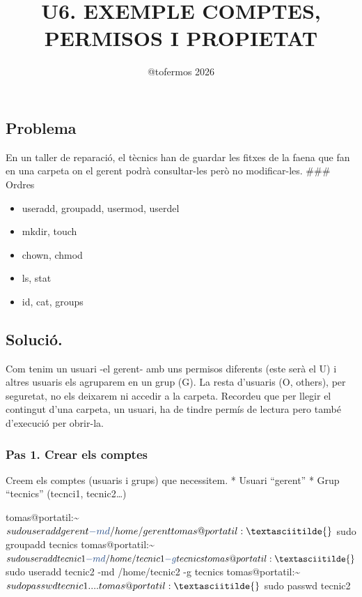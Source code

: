 \documentclass[
  catalan,
  a4paper,
]{article}
\title{U6. EXEMPLE COMPTES, PERMISOS I PROPIETAT}
\author{@tofermos 2026}
\date{}
\newenvironment{Shaded}{\begin{snugshade}}{\end{snugshade}}
\newcommand{\AttributeTok}[1]{\textcolor[rgb]{0.13,0.29,0.53}{#1}}
\newcommand{\ExtensionTok}[1]{#1}
\newcommand{\NormalTok}[1]{#1}
\providecommand{\tightlist}{%
  \setlength{\itemsep}{0pt}\setlength{\parskip}{0pt}}
\begin{document}
\maketitle

{
\setcounter{tocdepth}{2}
\tableofcontents
}
\newpage
\renewcommand\tablename{Tabla}

\subsection{Problema}\label{problema}

En un taller de reparació, el tècnics han de guardar les fitxes de la
faena que fan en una carpeta on el gerent podrà consultar-les però no
modificar-les. \#\#\# Ordres

\begin{itemize}
\tightlist
\item
  useradd, groupadd, usermod, userdel
\item
  mkdir, touch
\item
  chown, chmod
\item
  ls, stat
\item
  id, cat, groups
\end{itemize}

\subsection{Solució.}\label{soluciuxf3.}

Com tenim un usuari -el gerent- amb uns permisos diferents (este serà el
U) i altres usuaris els agruparem en un grup (G). La resta d'usuaris (O,
others), per seguretat, no els deixarem ni accedir a la carpeta.
Recordeu que per llegir el contingut d'una carpeta, un usuari, ha de
tindre permís de lectura pero també d'execució per obrir-la.

\subsubsection{Pas 1. Crear els comptes}\label{pas-1.-crear-els-comptes}

Creem els comptes (usuaris i grups) que necessitem. * Usuari ``gerent''
* Grup ``tecnics'' (tecnci1, tecnic2\ldots)

\begin{Shaded}
\begin{Highlighting}[]
\ExtensionTok{tomas@portatil:\textasciitilde{}$}\NormalTok{ sudo useradd gerent }\AttributeTok{{-}md}\NormalTok{ /home/gerent}
\ExtensionTok{tomas@portatil:\textasciitilde{}$}\NormalTok{ sudo groupadd tecnics}
\ExtensionTok{tomas@portatil:\textasciitilde{}$}\NormalTok{ sudo useradd tecnic1 }\AttributeTok{{-}md}\NormalTok{ /home/tecnic1 }\AttributeTok{{-}g}\NormalTok{ tecnics}
\ExtensionTok{tomas@portatil:\textasciitilde{}$}\NormalTok{ sudo useradd tecnic2 }\AttributeTok{{-}md}\NormalTok{ /home/tecnic2 }\AttributeTok{{-}g}\NormalTok{ tecnics}
\ExtensionTok{tomas@portatil:\textasciitilde{}$}\NormalTok{ sudo passwd tecnic1}
\ExtensionTok{....}
\ExtensionTok{tomas@portatil:\textasciitilde{}$}\NormalTok{ sudo passwd tecnic2}
\end{Highlighting}
\end{Shaded}
\end{document}
